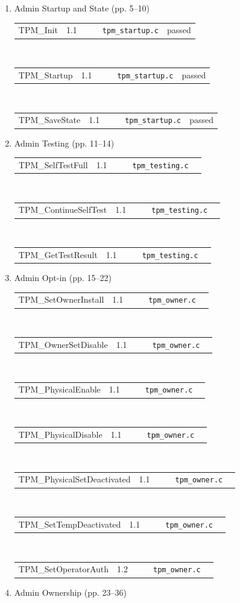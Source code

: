 \documentclass[runningheads]{llncs}
\begin{document}
\newcommand{\tpmcmd}[6]{
	\begin{tabular}{p{4.5cm}|p{0.35cm}|p{0.4cm}|p{0.25cm}|p{2.5cm}|p{2cm}}
		\rowcolor{\tpmcolor}
			{\scriptsize\textsf{#1}} &
			{\scriptsize\textsf{#2}} &
			{\scriptsize\makebox[0.4cm][r]{#3}} &
			{\scriptsize\makebox[0.25cm][c]{#4}} &
			{\scriptsize\texttt{#5}} &
			{\scriptsize #6}\\
	\end{tabular}
}
\newcommand{\tpmcmdr}[6]{
	\renewcommand{\tpmcolor}{\tpmred}
	\tpmcmd{#1}{#2}{#3}{#4}{#5}{#6}
	\renewcommand{\tpmcolor}{tpmgray}
}
\newcommand{\tpmcmdg}[6]{
	\renewcommand{\tpmcolor}{\tpmgreen}
	\tpmcmd{#1}{#2}{#3}{#4}{#5}{#6}
	\renewcommand{\tpmcolor}{tpmgray}
}
\newcommand{\tpmcmdy}[6]{
	\renewcommand{\tpmcolor}{\tpmyellow}
	\tpmcmd{#1}{#2}{#3}{#4}{#5}{#6}
	\renewcommand{\tpmcolor}{tpmgray}
}
\begin{enumerate}
	\item Admin Startup and State (pp. 5--10)\\
\tpmcmdg{TPM\_Init}{1.1}{151}{M}{tpm\_startup.c}{passed \cite{trousers,sirix}}\\
\tpmcmdg{TPM\_Startup}{1.1}{153}{M}{tpm\_startup.c}{passed \cite{trousers,sirix}}\\
\tpmcmdg{TPM\_SaveState}{1.1}{152}{M}{tpm\_startup.c}{passed \cite{trousers,sirix}}
	\item Admin Testing (pp. 11--14)\\
\tpmcmdg{TPM\_SelfTestFull}{1.1}{80}{M}{tpm\_testing.c}{}\\
\tpmcmdg{TPM\_ContinueSelfTest}{1.1}{83}{M}{tpm\_testing.c}{}\\
\tpmcmdg{TPM\_GetTestResult}{1.1}{84}{M}{tpm\_testing.c}{}
	\item Admin Opt-in (pp. 15--22)\\
\tpmcmdg{TPM\_SetOwnerInstall}{1.1}{113}{M}{tpm\_owner.c}{}\\
\tpmcmdg{TPM\_OwnerSetDisable}{1.1}{110}{M}{tpm\_owner.c}{}\\
\tpmcmdg{TPM\_PhysicalEnable}{1.1}{111}{M}{tpm\_owner.c}{}\\
\tpmcmdg{TPM\_PhysicalDisable}{1.1}{112}{M}{tpm\_owner.c}{}\\
\tpmcmdg{TPM\_PhysicalSetDeactivated}{1.1}{114}{M}{tpm\_owner.c}{}\\
\tpmcmdg{TPM\_SetTempDeactivated}{1.1}{115}{M}{tpm\_owner.c}{}\\
\tpmcmdg{TPM\_SetOperatorAuth}{1.2}{116}{M}{tpm\_owner.c}{}
	\item Admin Ownership (pp. 23--36)\\

\end{enumerate}
\end{document}
